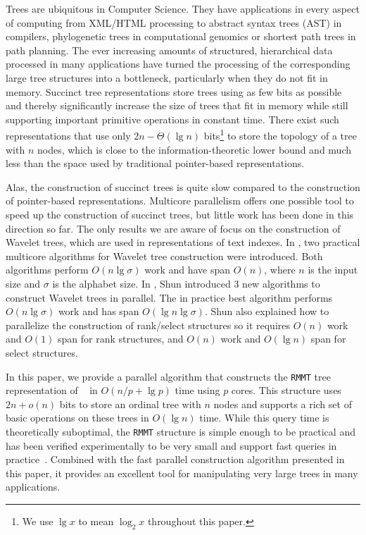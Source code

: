 Trees are ubiquitous in Computer Science.  They have applications in
every aspect of computing from XML/HTML processing to abstract syntax
trees (AST) in compilers, phylogenetic trees in computational genomics
or shortest path trees in path planning.  The ever increasing amounts
of structured, hierarchical data processed in many applications have
turned the processing of the corresponding large tree structures into
a bottleneck, particularly when they do not fit in memory.  Succinct
tree representations store trees using as few bits as possible and
thereby significantly increase the size of trees that fit in memory
while still supporting important primitive operations in constant
time.  There exist such representations that use only $2n - \Theta(\lg
n)$ bits\footnote{We use $\lg x$ to mean $\log_{2}x$ throughout this
paper.} to store the topology of a tree with $n$ nodes, which is close
to the information-theoretic lower bound and much less than the space
used by traditional pointer-based representations.

Alas, the construction of succinct trees is quite slow compared to the
construction of pointer-based representations.  Multicore parallelism
offers one possible tool to speed up the construction of succinct
trees, but little work has been done in this direction so far.  The
only results we are aware of focus on the construction of Wavelet
trees, which are used in representations of text indexes.  In
\cite{Fuentes2014}, two practical multicore algorithms for Wavelet
tree construction were introduced.  Both algorithms perform $O(n\lg
\sigma)$ work and have span $O(n)$, where $n$ is the input size and
$\sigma$ is the alphabet size.  In \cite{DBLP:journals/corr/Shun14},
Shun introduced 3 new algorithms to construct Wavelet trees in
parallel.  The in practice best algorithm performs $O(n\lg \sigma)$
work and has span $O(\lg n\lg \sigma)$.  Shun also explained how to
parallelize the construction of rank/select structures so it requires
$O(n)$ work and $O(1)$ span for rank structures, and $O(n)$ work and
$O(\lg n)$ span for select structures.

In this paper, we provide a parallel algorithm that constructs the
{\tt RMMT} tree representation of
~\cite{Navarro:2014:FFS:2620785.2601073} in $O(n/p + \lg p)$ time
using $p$ cores.  This structure uses $2n + o(n)$ bits to store an
ordinal tree with $n$ nodes and supports a rich set of basic
operations on these trees in $O(\lg n)$ time.  While this query time
is theoretically suboptimal, the {\tt RMMT} structure is simple enough
to be practical and has been verified experimentally to be very small
and support fast queries in practice~\cite{ACNSalenex10}.  Combined
with the fast parallel construction algorithm presented in this paper,
it provides an excellent tool for manipulating very large trees in
many applications.

